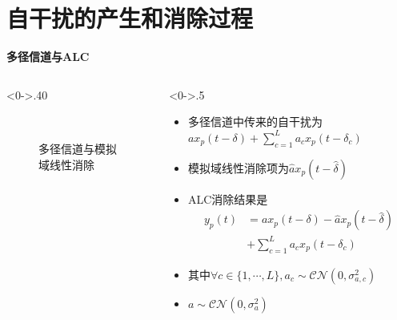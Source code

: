\section{自干扰的产生和消除过程}
    
    \frame{\sectionpage}
\begin{frame}{\textbf{多径信道与ALC}}
	\begin{columns}[T] %
		\begin{column}<0->{.40\textwidth}
			\begin{figure}[thpb]
				\centering
				$\quad$\caption{多径信道与模拟域线性消除}
				\label{fig:campus}
			\end{figure}
		\end{column}%
		\hfill%
		\begin{column}<0->{.5\textwidth}
			\begin{itemize}
				\item 多径信道中传来的自干扰为$ax_p(t-\delta) + \sum_{c=1}^{L}a_cx_p(t-\delta_c)$
				\item 模拟域线性消除项为$\widehat{a}x_p(t-\widehat{\delta})$
				\item ALC消除结果是
				\begin{equation*}
					\begin{split}
						y_p(t) &= ax_p(t-\delta) - \widehat{a}x_p(t-\widehat{\delta}) \\
						&+ \sum_{c=1}^{L}a_cx_p(t-\delta_c)
					\end{split}
				\end{equation*}
				\item 其中$\forall c\in\{1,\cdots,L\},a_c\sim\mathcal{CN}(0,\sigma^2_{a,c})$
				\item $a\sim \mathcal{CN}(0,\sigma^2_{a})$
			\end{itemize}
		\end{column}%
	\end{columns}
\end{frame}

